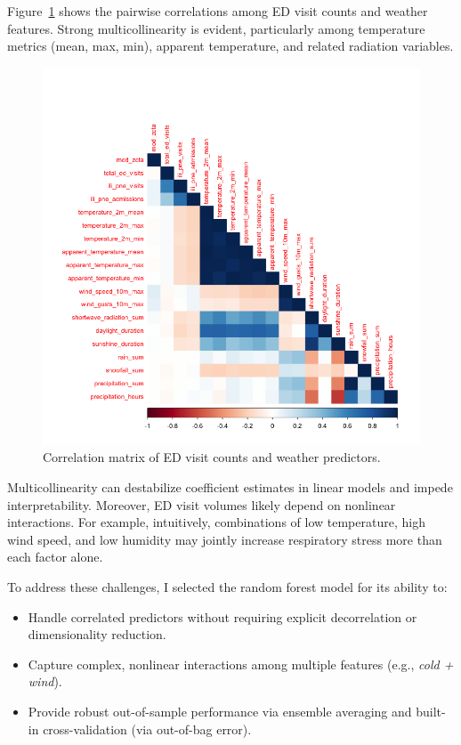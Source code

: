 \documentclass[11pt]{article}
\begin{document}
Figure~\ref{fig:corrplot} shows the pairwise correlations among ED visit counts and weather features.  Strong multicollinearity is evident, particularly among temperature metrics (mean, max, min), apparent temperature, and related radiation variables.

\begin{figure}[]
  \centering
  \includegraphics[width=1\textwidth]{corrplot.png}
  \caption{Correlation matrix of ED visit counts and weather predictors.}
  \label{fig:corrplot}
\end{figure}

Multicollinearity can destabilize coefficient estimates in linear models and impede interpretability.  Moreover, ED visit volumes likely depend on nonlinear interactions. For example, intuitively, combinations of low temperature, high wind speed, and low humidity may jointly increase respiratory stress more than each factor alone.  

To address these challenges, I selected the random forest model for its ability to:
\begin{itemize}[nosep]
  \item Handle correlated predictors without requiring explicit decorrelation or dimensionality reduction.
  \item Capture complex, nonlinear interactions among multiple features (e.g., \emph{cold + wind}).
  \item Provide robust out-of-sample performance via ensemble averaging and built-in cross-validation (via out-of-bag error).
\end{itemize}
\end{document}
